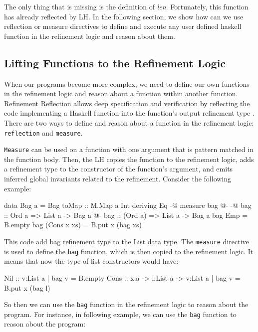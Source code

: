 \documentclass[]{rptuseminar}
\begin{document}
The only thing that is missing is the definition of \textit{len}. Fortunately, this function has already reflected by
LH. In the following section, we show how can we use reflection or measure directives to define and execute any user defined haskell function in the refinement logic and
reason about them.

\subsection{Lifting Functions to the Refinement Logic}
When our programs become more complex, we need to define our own functions in the refinement logic and reason about
a function within another function. Refinement Reflection allows deep specification and verification by 
reflecting the code implementing a Haskell function into the function’s output refinement type \cite{niki_blog_2016}.
There are two ways to define and reason about a function in the refinement logic: \texttt{reflection} and \texttt{measure}. 

\texttt{Measure} can be used on a function with one argument that is pattern matched in the function body. Then, the
LH copies the function to the refinement logic, adds a refinement type to the constructor of the function's argument, and emits inferred global
invariants related to the refinement. Consider the following example:

\begin{haskell}
data Bag a = Bag { toMap :: M.Map a Int } deriving Eq
{-@ measure bag @-}
{-@ bag :: Ord a => List a -> Bag a @-}
bag :: (Ord a) => List a -> Bag a
bag Emp = B.empty
bag (Cons x xs) = B.put x (bag xs)
\end{haskell}

This code add bag refinement type to the List data type. The \texttt{measure} directive is used to define the \texttt{bag} function,
which is then copied to the refinement logic. It means that now the type of list constructors would have:

\begin{haskell}
Nil  :: {v:List a | bag v = B.empty}
Cons :: x:a -> l:List a -> {v:List a | bag v = B.put x (bag l)}
\end{haskell}

So then we can use the \texttt{bag} function in the refinement logic to reason about the program. 
For instance, in following example, we can use the \texttt{bag} function to reason about the program:

\end{document}
